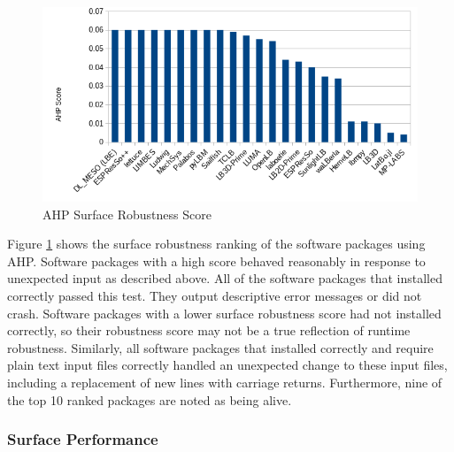 \documentclass[12pt, notitlepage]{article}
\begin{document}
\begin{figure}[h!]
	\begin{center}
		\includegraphics[width=1.0\textwidth]{robustness_chart}
		\caption{AHP Surface Robustness Score}
		\label{Fig_Robustness}
	\end{center}
\end{figure}

Figure \ref{Fig_Robustness} shows the surface robustness ranking of the software packages using AHP. Software packages with a high score behaved reasonably in response to unexpected input as described above. All of the software packages that installed correctly passed this test. They output descriptive error messages or did not crash. Software packages with a lower surface robustness score had not installed correctly, so their robustness score may not be a true reflection of runtime robustness. Similarly, all software packages that installed correctly and require plain text input files correctly handled an unexpected change to these input files, including a replacement of new lines with carriage returns. Furthermore, nine of the top 10 ranked packages are noted as being alive. 

\subsubsection{Surface Performance}
\end{document}
